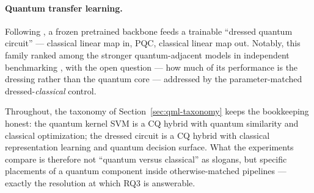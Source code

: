 \paragraph{Quantum transfer learning.} Following \citet{mari2020transfer}, a
frozen pretrained backbone feeds a trainable ``dressed quantum circuit'' ---
classical linear map in, PQC, classical linear map out. Notably, this family
ranked among the stronger quantum-adjacent models in independent benchmarking
\citep{bowles2024better}, with the open question --- how much of its
performance is the dressing rather than the quantum core --- addressed by the
parameter-matched dressed-\emph{classical} control.

Throughout, the taxonomy of Section~\ref{sec:qml-taxonomy} keeps the
bookkeeping honest: the quantum kernel SVM is a CQ hybrid with quantum
similarity and classical optimization; the dressed circuit is a CQ hybrid with
classical representation learning and quantum decision surface. What the
experiments compare is therefore not ``quantum versus classical'' as slogans,
but specific placements of a quantum component inside otherwise-matched
pipelines --- exactly the resolution at which RQ3 is answerable.
